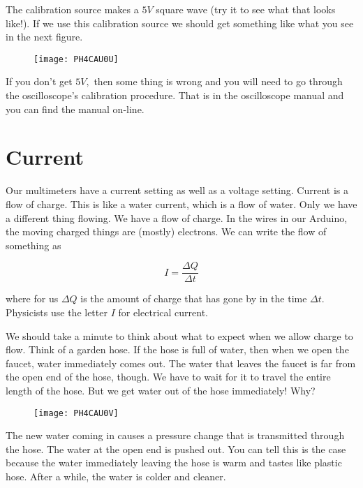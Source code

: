 The calibration source makes a $5\unit{V}$ square wave (try it to see what that looks like!). If we use this calibration source we should get something like what you see in the next figure. 

\begin{figure}[h!]
	\centering
    \texttt{[image: PH4CAU0U]}
\end{figure}

If you don't get $5\unit{V},$ then some thing is wrong and you will need to go through the oscilloscope's calibration procedure. That is in the oscilloscope manual and you can find
the manual on-line.

\section{Current}

Our multimeters have a current setting as well as a voltage setting. Current is a flow of charge. This is like a water current, which is a flow of water. Only we have a different thing flowing. We have a flow of charge. In the wires in our Arduino, the moving charged things are (mostly) electrons. We can write the flow of something as 

\begin{equation*}
	I=\frac{\Delta Q}{\Delta t}
\end{equation*}

where for us $\Delta Q$ is the amount of charge that has gone by in the time 
$\Delta t.$ Physicists use the letter $I$ for electrical current.

We should take a minute to think about what to expect when we allow charge to flow. Think of a garden hose. If the hose is full of water, then when we open the faucet, water immediately comes out. The water that leaves the faucet is far from the open end of the hose, though. We have to wait for it to travel the entire length of the hose. But we get water out of the hose immediately! Why? 

\begin{figure}[h!]
	\centering
    \texttt{[image: PH4CAU0V]}
\end{figure}

The new water coming in causes a pressure change that is transmitted through the hose. The water at the open end is pushed out. You can tell this is the case because the water immediately leaving the hose is warm and tastes like plastic hose. After a while, the water is colder and cleaner.


